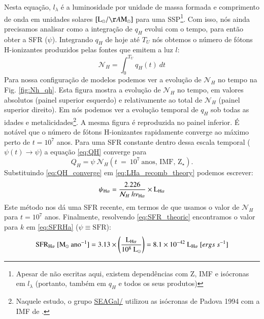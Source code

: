 \noindent Nesta equação, $l_\lambda$ é a luminosidade por unidade de massa formada e comprimento de
onda em unidades solares $[\textrm{L}_\odot/\AA\textrm{M}_\odot]$ para uma SSP\footnote{Apesar de
não escritas aqui, existem dependências com Z, IMF e isócronas em $l_\lambda$ (portanto, também em
$q_H$ e todos os seus produtos)}. Com isso, nós ainda precisamos analisar como a integração de
$q_H$ evolui com o tempo, para então obter a SFR ($\psi$). Integrando $q_H$ de hoje até $T_U$ nós
obtemos o número de fótons H-ionizantes produzidos pelas fontes que emitem a luz $l$:
\begin{equation}
	\mathcal{N}_H = \int_0^{T_U} q_H(t)\ dt
\end{equation}
Para nossa configuração de modelos podemos ver a evolução de $\mathcal{N}_H$ no tempo na Fig.
\ref{fig:Nh_qh}. Esta figura mostra a evolução de $\mathcal{N}_H$ no tempo, em valores absolutos
(painel superior esquerdo) e relativamente ao total de $\mathcal{N}_H$ (painel superior direito).
Em \citet[Fig. 2b]{CidFernandes.etal.2011a} nós podemos ver a evolução temporal de $q_H$ sob
todas as idades e metalicidades\footnote{Naquele estudo, o
grupo \href{http://starlight.ufsc.br}{SEAGal/\STARLIGHT} utilizou as isócronas de Padova 1994 com a
IMF de \citet{Chabrier.2003a}.}. A mesma figura é reproduzida no painel inferior. É notável que o
número de fótons H-ionizantes rapidamente converge ao máximo perto de $t = 10^7$ anos. Para uma SFR
constante dentro dessa escala temporal ($\psi(t)\rightarrow \psi$) a equação \eqref{eq:QH} converge
para
\begin{equation}
	Q_H = \psi\ \mathcal{N}_H(t\ =\ 10^7\ \textrm{anos, IMF, Z}{}_\star).
	\label{eq:QH_converge}
\end{equation}
\noindent Substituindo \eqref{eq:QH_converge} em \eqref{eq:LHa_recomb_theory} podemos escrever:
\begin{equation}
	\psi_{\Halpha} = \frac{2.226}{\mathcal{N}_H\ h \nu_{\Halpha}} \times \LHalpha
	\label{eq:SFR_theoric}
\end{equation}
\noindent Este método nos dá uma SFR recente, em termos de que usamos o valor de $\mathcal{N}_H$
para $t = 10^7$ anos. Finalmente, resolvendo \eqref{eq:SFR_theoric} encontramos o valor para $k$ em
\eqref{eq:SFRHa} ($\psi \equiv \mathrm{SFR}$):
\begin{equation}
	\mathrm{SFR}_{\Halpha}\ [\mathrm{M}_\odot\ \mathrm{ano}^{-1}] = 3.13 \times
	\left(\frac{\LHalpha}{10^8\ \mathrm{L}_\odot}\right) = 8.1 \times 10^{-42}\ \LHalpha\ [ergs\ s^{-1}]
	\label{eq:SFRNeb}
\end{equation}

